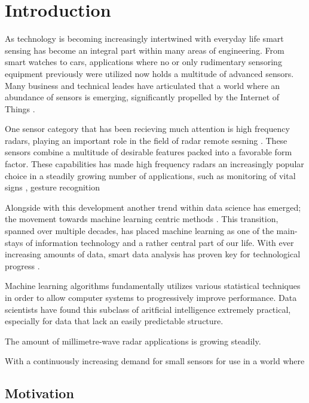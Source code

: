 \chapter{Introduction}

As technology is becoming increasingly intertwined with everyday life smart sensing has become an integral part within many areas of engineering. From smart watches to cars, applications where no or only rudimentary sensoring equipment previously were utilized now holds a multitude of advanced sensors. Many business and technical leades have articulated that a world where an abundance of sensors is emerging, significantly propelled by the Internet of Things \citep{bryzek_2013}. 

One sensor category that has been recieving much attention is high frequency radars, playing an important role in the field of radar remote sesning \citep{frenzel_2018}. These sensors combine a multitude of desirable features packed into a favorable form factor. These capabilities has made high frequency radars an increasingly popular choice in a steadily growing number of applications, such as monitoring of vital signs \citep{kuo_lin_yu_lo_lyu_chou_chuang_2016}, gesture recognition \citep{lien_gillian_karagozler_amihood_schwesig_olson_raja_poupyrev_2016}

Alongside with this development another trend within data science has emerged; the movement towards machine learning centric methods . This transition, spanned over multiple decades, has placed machine learning as one of the main-stays of information technology and a rather central part of our life. With ever increasing amounts of data, smart data analysis has proven key for technological progress \citep{a_smola_svn_vishwanathan_2010}.

Machine learning algorithms fundamentally utilizes various statistical techniques in order to allow computer systems to progressively improve performance. Data scientists have found this subclass of aritficial intelligence extremely practical, especially for data that lack an easily predictable structure. 

The amount of millimetre-wave radar applications is growing steadily.

With a continuously increasing demand for small sensors for use in a world where 

\section{Motivation}


